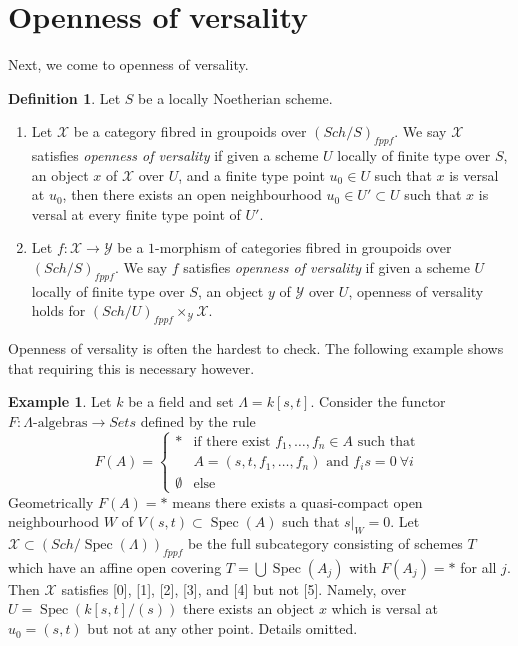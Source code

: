 \documentclass{stacks-project}
\theoremstyle{plain}
\theoremstyle{definition}
\newtheorem{definition}[subsection]{Definition}
\newtheorem{example}[subsection]{Example}
\theoremstyle{remark}
\numberwithin{equation}{subsection}
\def\Spec{\mathop{\mathrm{Spec}}}
\def\Sch{\mathit{Sch}}
\begin{document}
\section{Openness of versality}
\label{section-openness-versality}

\noindent
Next, we come to openness of versality.

\begin{definition}
\label{definition-openness-versality}
Let $S$ be a locally Noetherian scheme.
\begin{enumerate}
\item Let $\mathcal{X}$ be a category
fibred in groupoids over $(\Sch/S)_{fppf}$. We say $\mathcal{X}$ satisfies
{\it openness of versality} if given a scheme $U$ locally of finite type
over $S$, an object $x$ of $\mathcal{X}$ over $U$, and a finite type point
$u_0 \in U$ such that $x$ is versal at $u_0$, then there exists an open
neighbourhood $u_0 \in U' \subset U$ such that $x$ is versal at every finite
type point of $U'$.
\item Let $f : \mathcal{X} \to \mathcal{Y}$ be a $1$-morphism of categories
fibred in groupoids over $(\Sch/S)_{fppf}$. We say $f$ satisfies
{\it openness of versality} if given a scheme $U$ locally of finite type
over $S$, an object $y$ of $\mathcal{Y}$ over $U$, openness
of versality holds for
$(\Sch/U)_{fppf} \times_\mathcal{Y} \mathcal{X}$.
\end{enumerate}
\end{definition}

\noindent
Openness of versality is often the hardest to check. The following example
shows that requiring this is necessary however.

\begin{example}
\label{example-versality}
Let $k$ be a field and set $\Lambda = k[s, t]$. Consider the functor
$F : \Lambda\text{-algebras} \longrightarrow \textit{Sets}$
defined by the rule
$$
F(A) =
\left\{
\begin{matrix}
* & \text{if there exist }f_1, \ldots, f_n \in A\text{ such that } \\
  & A = (s, t, f_1, \ldots, f_n)\text{ and } f_i s = 0\ \forall i \\
\emptyset & \text{else}
\end{matrix}
\right.
$$
Geometrically $F(A) = *$ means there exists a quasi-compact open neighbourhood
$W$ of $V(s, t) \subset \Spec(A)$ such that $s|_W = 0$.
Let $\mathcal{X} \subset (\Sch/\Spec(\Lambda))_{fppf}$ be the full
subcategory consisting of schemes $T$ which have an affine open covering
$T = \bigcup \Spec(A_j)$ with $F(A_j) = *$ for all $j$. Then $\mathcal{X}$
satisfies [0], [1], [2], [3], and [4] but not [5]. Namely, over
$U = \Spec(k[s, t]/(s))$
there exists an object $x$ which is versal at $u_0 = (s, t)$ but not
at any other point. Details omitted.
\end{example}
\end{document}
